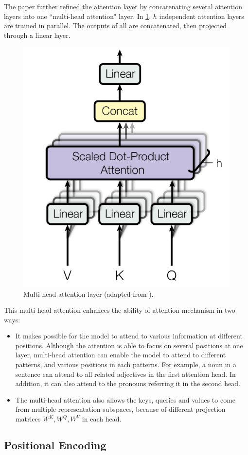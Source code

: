 The paper further refined the attention layer by concatenating several attention layers into one ``multi-head attention" layer.
In \cref{fig:multihead-attention-layer}, $h$ independent attention layers are trained in parallel.
The outputs of all are concatenated, then projected through a linear layer.

\begin{figure}[t]
    \centering
    \includegraphics[width=0.5\linewidth]{img/multihead-attention.png}
    \caption{Multi-head attention layer (adapted from \cite{DBLP:conf/nips/VaswaniSPUJGKP17}).}
    \label{fig:multihead-attention-layer}
\end{figure}

This multi-head attention enhances the ability of attention mechanism in two ways:
\begin{itemize}
    \item It makes possible for the model to attend to various information at different positions. Although the attention is able to focus on several positions at one layer, multi-head attention can enable the model to attend to different patterns, and various positions in each patterns.
    For example, a noun in a sentence can attend to all related adjectives in the first attention head. In addition, it can also attend to the pronouns referring it in the second head.
    \item The multi-head attention also allows the keys, queries and values to come from multiple representation subspaces, because of different projection matrices $W^K, W^Q, W^V$ in each head.
\end{itemize}

\subsection{Positional Encoding}
\label{lit-trans-pos}

